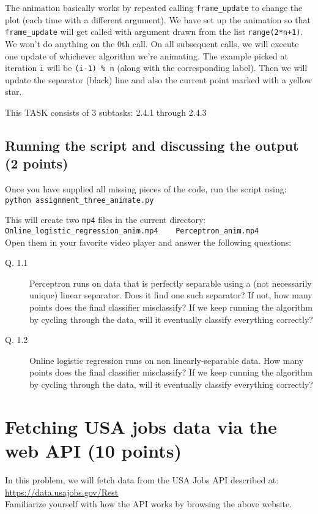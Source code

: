 \documentclass{article}
\begin{document}
The animation basically works by repeated calling {\tt frame\_update} to change the plot (each time with a different argument).
We have set up the animation so that {\tt frame\_update} will get called with argument drawn from the list {\tt range(2*n+1)}.
We won't do anything on the $0$th call. On all subsequent calls, we will execute one update of whichever algorithm we're animating.
The example picked at iteration {\tt i} will be {\tt (i-1) \% n} (along with the corresponding label). 
Then we will update the separator (black) line and also the current point marked with a yellow star.

This TASK consists of 3 subtasks: 2.4.1 through 2.4.3

\subsection{Running the script and discussing the output (2 points)}

Once you have supplied all missing pieces of the code, run the script using:\\
{\tt python assignment\_three\_animate.py}

This will create two {\tt mp4} files in the current directory:\\
\verb#Online_logistic_regression_anim.mp4    Perceptron_anim.mp4#\\
Open them in your favorite video player and
answer the following questions:
\begin{description}
\item[Q. 1.1]
Perceptron runs on data that is perfectly separable using a (not necessarily unique) linear separator. Does it find one such separator?
If not, how many points does the final classifier misclassify? If we keep running the algorithm by cycling through the data, will it eventually classify everything correctly?
\item[Q. 1.2]
Online logistic regression runs on non linearly-separable data. How many points does the final classifier misclassify? 
If we keep running the algorithm by cycling through the data, will it eventually classify everything correctly?  
\end{description}

\section{Fetching USA jobs data via the web API (10 points)}

In this problem, we will fetch data from the USA Jobs API described at:\\
\url{https://data.usajobs.gov/Rest} \\
Familiarize yourself with how the API works by browsing the above website.
\end{document}
